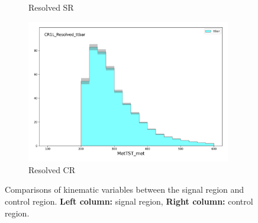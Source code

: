 \begin{figure}[htbp]
\begin{subfigure}{0.49\textwidth}
      \caption{Resolved SR \met}
      \end{subfigure}
      \begin{subfigure}{0.49\textwidth}
      \includegraphics[width = 0.98\textwidth]{Figures/4/CRSR/CR1L_Resolved_ttbar/MetTST_met.png}
      \caption{Resolved CR \met}
      \end{subfigure}


       \caption{Comparisons of kinematic variables between the \resolved signal region and \ttbar control region. \textbf{Left column:} signal region, \textbf{Right column:} control region.}
       \label{fig:CRSR_resolved}
    \end{figure}
